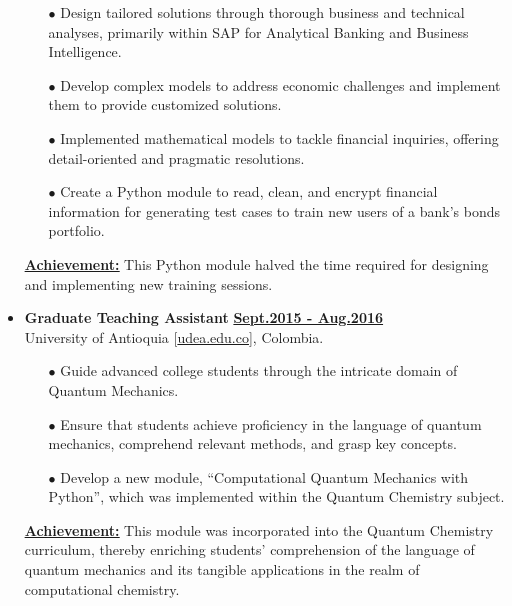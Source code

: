 \begin{itemize}[leftmargin=5mm]
\begin{itemize}[leftmargin=0mm]
              \item[$\bullet$] Design tailored solutions through thorough business and technical analyses, primarily within SAP for Analytical Banking and Business Intelligence.
              \item[$\bullet$] Develop complex models to address economic challenges and implement them to provide customized solutions.
              \item[$\bullet$] Implemented mathematical models to tackle financial inquiries, offering detail-oriented and pragmatic resolutions.
              \item[$\bullet$] Create a Python module to read, clean, and encrypt financial information for generating test cases to train new users of a bank's bonds portfolio.
          \end{itemize}

          \textbf{\href{.}{\underline{Achievement:}}}
          This Python module halved the time required for designing and implementing new training sessions.

    \item \textbf{\large Graduate Teaching Assistant}\hfill
          \href{.}{\bf Sept.2015 - Aug.2016}\\
          University of Antioquia [\href{www.udea.edu.co}{udea.edu.co}],
          Colombia.

          \begin{itemize}[leftmargin=0mm]
              \small
              \itemsep-1mm

              \item[$\bullet$] Guide advanced college students through the intricate domain of Quantum Mechanics.
              \item[$\bullet$] Ensure that students achieve proficiency in the language of quantum mechanics, comprehend relevant methods, and grasp key concepts.
              \item[$\bullet$] Develop a new module, ``Computational Quantum Mechanics with Python'', which was implemented within the Quantum Chemistry subject.
          \end{itemize}

          \textbf{\href{.}{\underline{Achievement:}}}
          This module was incorporated into the Quantum Chemistry curriculum, thereby enriching students' comprehension of the language of quantum mechanics and its tangible applications in the realm of computational chemistry.

\end{itemize}
